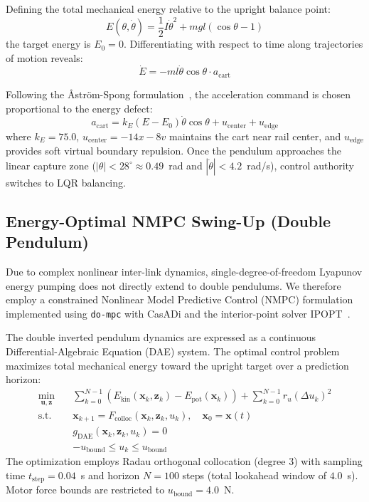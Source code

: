 \documentclass[conference]{IEEEtran}
\begin{document}
Defining the total mechanical energy relative to the upright balance point:
\begin{equation}
E(\theta, \dot{\theta}) = \frac{1}{2} I \dot{\theta}^2 + m g l (\cos\theta - 1)
\end{equation}
the target energy is $E_0 = 0$. Differentiating with respect to time along trajectories of motion reveals:
\begin{equation}
\dot{E} = -m l \dot{\theta} \cos\theta \cdot a_{\text{cart}}
\end{equation}

Following the Åström-Spong formulation~\cite{ref_astrom, ref_spong}, the acceleration command is chosen proportional to the energy defect:
\begin{equation}
a_{\text{cart}} = k_E (E - E_0) \dot{\theta} \cos\theta + u_{\text{center}} + u_{\text{edge}}
\end{equation}
where $k_E = 75.0$, $u_{\text{center}} = -14x - 8v$ maintains the cart near rail center, and $u_{\text{edge}}$ provides soft virtual boundary repulsion. Once the pendulum approaches the linear capture zone ($|\theta| < 28^\circ \approx 0.49$~rad and $|\dot{\theta}| < 4.2$~rad/s), control authority switches to LQR balancing.

\subsection{Energy-Optimal NMPC Swing-Up (Double Pendulum)}
Due to complex nonlinear inter-link dynamics, single-degree-of-freedom Lyapunov energy pumping does not directly extend to double pendulums. We therefore employ a constrained Nonlinear Model Predictive Control (NMPC) formulation implemented using \texttt{do-mpc} with CasADi and the interior-point solver IPOPT~\cite{ref_casadi}.

The double inverted pendulum dynamics are expressed as a continuous Differential-Algebraic Equation (DAE) system. The optimal control problem maximizes total mechanical energy toward the upright target over a prediction horizon:
\begin{align}
\min_{\mathbf{u}, \mathbf{z}} \quad & \sum_{k=0}^{N-1} \left( E_{\text{kin}}(\mathbf{x}_k, \mathbf{z}_k) - E_{\text{pot}}(\mathbf{x}_k) \right) + \sum_{k=0}^{N-1} r_u (\Delta u_k)^2 \\
\text{s.t.} \quad & \mathbf{x}_{k+1} = F_{\text{colloc}}(\mathbf{x}_k, \mathbf{z}_k, u_k), \quad \mathbf{x}_0 = \mathbf{x}(t) \\
& g_{\text{DAE}}(\mathbf{x}_k, \mathbf{z}_k, u_k) = 0 \\
& -u_{\text{bound}} \le u_k \le u_{\text{bound}}
\end{align}
The optimization employs Radau orthogonal collocation (degree 3) with sampling time $t_{\text{step}} = 0.04$~s and horizon $N = 100$ steps (total lookahead window of $4.0$~s). Motor force bounds are restricted to $u_{\text{bound}} = 4.0$~N.
\end{document}
